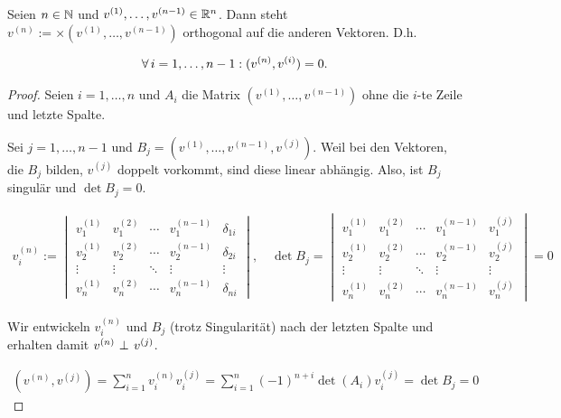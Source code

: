 \begin{theorem*}

Seien $n \in \mathbb{N}$ und $v^{(1)}, \ldots, v^{(n-1)} \in \mathbb{R}^n$.
Dann steht $v^{(n)} := \times(v^{(1)}, \ldots, v^{(n-1)})$ orthogonal auf die anderen Vektoren.
D.h.

\begin{align*}
  \forall \, i = 1, \ldots, n-1:
  (v^{(n)}, v^{(i)}) = 0.
\end{align*}

\end{theorem*}

\begin{proof}

Seien $i = 1, \ldots, n$ und $A_i$ die Matrix $(v^{(1)}, \ldots, v^{(n-1)})$ ohne die $i$-te Zeile und letzte Spalte.

Sei $j = 1, \ldots, n-1$ und $B_j = (v^{(1)}, \ldots, v^{(n-1)}, v^{(j)})$.
Weil bei den Vektoren, die $B_j$ bilden, $v^{(j)}$ doppelt vorkommt, sind diese linear abhängig.
Also, ist $B_j$ singulär und $\det{B_j} = 0$.

\begin{align*}
  v^{(n)}_i
  :=
  \begin{vmatrix}
    v^{(1)}_1 & v^{(2)}_1 & \cdots & v^{(n-1)}_1 & \delta_{1 i} \\
    v^{(1)}_2 & v^{(2)}_2 & \cdots & v^{(n-1)}_2 & \delta_{2 i} \\
    \vdots    & \vdots    & \ddots & \vdots      & \vdots \\
    v^{(1)}_n & v^{(2)}_n & \cdots & v^{(n-1)}_n & \delta_{n i}
  \end{vmatrix},
  \quad
  \det{B_j}
  =
  \begin{vmatrix}
    v^{(1)}_1 & v^{(2)}_1 & \cdots & v^{(n-1)}_1 & v^{(j)}_1 \\
    v^{(1)}_2 & v^{(2)}_2 & \cdots & v^{(n-1)}_2 & v^{(j)}_2 \\
    \vdots    & \vdots    & \ddots & \vdots      & \vdots \\
    v^{(1)}_n & v^{(2)}_n & \cdots & v^{(n-1)}_n & v^{(j)}_n
  \end{vmatrix}
  = 0
\end{align*}

Wir entwickeln $v^{(n)}_i$ und $B_j$ (trotz Singularität) nach der letzten Spalte und erhalten damit $v^{(n)} ~\bot_{}~ v^{(j)}$.

\begin{align*}
  (v^{(n)}, v^{(j)})
  =
  \sum_{i=1}^n
  v^{(n)}_i
  v^{(j)}_i
  =
  \sum_{i=1}^n
  (-1)^{n + i} \det{(A_i)}
  v^{(j)}_i
  =
  \det{B_j} = 0
\end{align*}

\end{proof}
